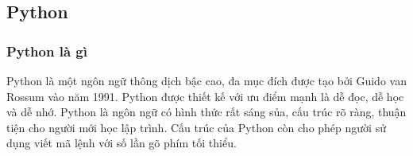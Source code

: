 \subsection{Python}
\subsubsection{Python là gì}

\begin{center}
  \captionsetup{type=figure}
  
\end{center}

Python là một ngôn ngữ thông dịch bậc cao, đa mục đích được tạo bởi Guido van Rossum vào năm 1991. Python được thiết kế với ưu điểm mạnh là dễ đọc, dễ học và dễ nhớ. Python là ngôn ngữ có hình thức rất sáng sủa, cấu trúc rõ ràng, thuận tiện cho người mới học lập trình. Cấu trúc của Python còn cho phép người sử dụng viết mã lệnh với số lần gõ phím tối thiểu.
